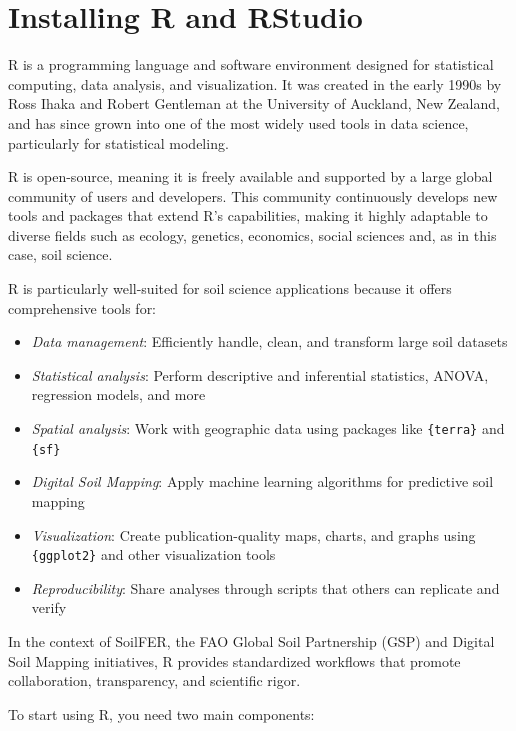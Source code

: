\documentclass[
  10pt,
  b5paper,
  oneside]{book}
\begin{document}
\section*{Installing R and RStudio}\label{installing-r-and-rstudio}

R is a programming language and software environment designed for statistical computing, data analysis, and visualization.
It was created in the early 1990s by Ross Ihaka and Robert Gentleman at the University of Auckland, New Zealand, and has since grown into one of the most widely used tools in data science, particularly for statistical modeling.

R is open-source, meaning it is freely available and supported by a large global community of users and developers.
This community continuously develops new tools and packages that extend R's capabilities, making it highly adaptable to diverse fields such as ecology, genetics, economics, social sciences and, as in this case, soil science.

R is particularly well-suited for soil science applications because it offers comprehensive tools for:

\begin{itemize}
\item
  \emph{Data management}: Efficiently handle, clean, and transform large soil datasets
\item
  \emph{Statistical analysis}: Perform descriptive and inferential statistics, ANOVA, regression models, and more
\item
  \emph{Spatial analysis}: Work with geographic data using packages like \texttt{\{terra\}} and \texttt{\{sf\}}
\item
  \emph{Digital Soil Mapping}: Apply machine learning algorithms for predictive soil mapping
\item
  \emph{Visualization}: Create publication-quality maps, charts, and graphs using \texttt{\{ggplot2\}} and other visualization tools
\item
  \emph{Reproducibility}: Share analyses through scripts that others can replicate and verify
\end{itemize}

In the context of SoilFER, the FAO Global Soil Partnership (GSP) and Digital Soil Mapping initiatives, R provides standardized workflows that promote collaboration, transparency, and scientific rigor.

To start using R, you need two main components:
\end{document}
